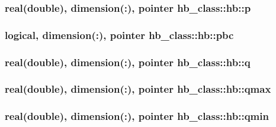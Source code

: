 \hypertarget{structhb__class_1_1hb_a138a258ac48be2d660556d987230a7b6}{
\subsubsection[{p}]{\setlength{\rightskip}{0pt plus 5cm}real(double), dimension(\+:), pointer hb\+\_\+class\+::hb\+::p\hspace{0.3cm}{\ttfamily [private]}}}\label{structhb__class_1_1hb_a138a258ac48be2d660556d987230a7b6}
\hypertarget{structhb__class_1_1hb_a076ab9d7a6a36a40529405c6fea62d70}{
\subsubsection[{pbc}]{\setlength{\rightskip}{0pt plus 5cm}logical, dimension(\+:), pointer hb\+\_\+class\+::hb\+::pbc\hspace{0.3cm}{\ttfamily [private]}}}\label{structhb__class_1_1hb_a076ab9d7a6a36a40529405c6fea62d70}
\hypertarget{structhb__class_1_1hb_aeb58002dd58afd2c2930db42209f19df}{
\subsubsection[{q}]{\setlength{\rightskip}{0pt plus 5cm}real(double), dimension(\+:), pointer hb\+\_\+class\+::hb\+::q\hspace{0.3cm}{\ttfamily [private]}}}\label{structhb__class_1_1hb_aeb58002dd58afd2c2930db42209f19df}
\hypertarget{structhb__class_1_1hb_a097cb0c17e9a6557efa84d638650899b}{
\subsubsection[{qmax}]{\setlength{\rightskip}{0pt plus 5cm}real(double), dimension(\+:), pointer hb\+\_\+class\+::hb\+::qmax\hspace{0.3cm}{\ttfamily [private]}}}\label{structhb__class_1_1hb_a097cb0c17e9a6557efa84d638650899b}
\hypertarget{structhb__class_1_1hb_ad39d5d28f5be03c2bc6d00ecbc847e72}{
\subsubsection[{qmin}]{\setlength{\rightskip}{0pt plus 5cm}real(double), dimension(\+:), pointer hb\+\_\+class\+::hb\+::qmin\hspace{0.3cm}{\ttfamily [private]}}}\label{structhb__class_1_1hb_ad39d5d28f5be03c2bc6d00ecbc847e72}
